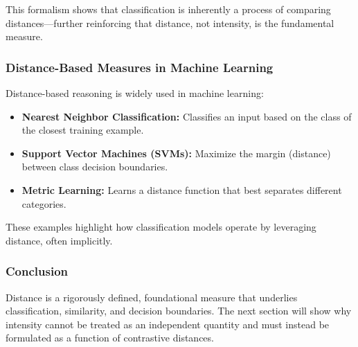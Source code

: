 This formalism shows that classification is inherently a process of comparing distances—further reinforcing that distance, not intensity, is the fundamental measure.

\subsubsection{Distance-Based Measures in Machine Learning}

Distance-based reasoning is widely used in machine learning:

\begin{itemize}
    \item \textbf{Nearest Neighbor Classification:} Classifies an input based on the class of the closest training example.
    \item \textbf{Support Vector Machines (SVMs):} Maximize the margin (distance) between class decision boundaries.
    \item \textbf{Metric Learning:} Learns a distance function that best separates different categories.
\end{itemize}

These examples highlight how classification models operate by leveraging distance, often implicitly.

\subsubsection{Conclusion}

Distance is a rigorously defined, foundational measure that underlies classification, similarity, and decision boundaries. The next section will show why intensity cannot be treated as an independent quantity and must instead be formulated as a function of contrastive distances.

